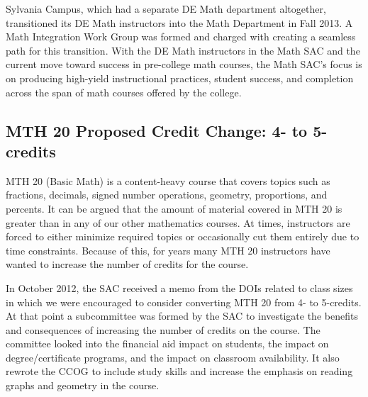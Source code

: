 Sylvania Campus, which had a separate DE Math department altogether,
transitioned its DE Math instructors into the Math Department in Fall 2013.  A
Math Integration Work Group was formed and charged with creating a seamless path
for this transition.  With the DE Math instructors in the Math SAC and the
current move toward success in pre-college math courses, the Math SAC's focus is
on producing high-yield instructional practices, student success, and completion
across the span of math courses offered by the college.
 
\subsection{MTH 20 Proposed Credit Change: 4- to 5-credits}\label{cur:sub:mth20}
MTH 20 (Basic Math) is a content-heavy course that covers topics such as
fractions, decimals, signed number operations, geometry, proportions, and
percents.  It can be argued that the amount of material covered in MTH 20 is
greater than in any of our other mathematics courses.  At times, instructors are
forced to either minimize required topics or occasionally cut them entirely due
to time constraints.  Because of this, for years many MTH 20 instructors have
wanted to increase the number of credits for the course.  

In October 2012, the SAC received a memo from the DOIs related to class sizes in
which we were encouraged to consider converting MTH 20 from 4- to 5-credits.  At
that point a subcommittee was formed by the SAC to investigate the benefits and
consequences of increasing the number of credits on the course.  The committee
looked into the financial aid impact on students, the impact on
degree/certificate programs, and the impact on classroom availability.  It also
rewrote the CCOG to include study skills and increase the emphasis on reading
graphs and geometry in the course.  

